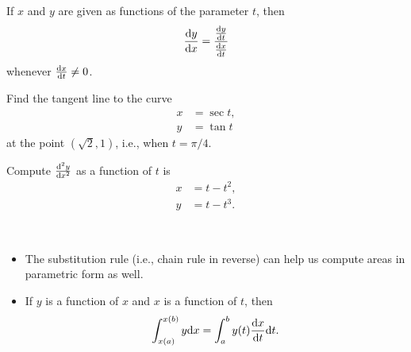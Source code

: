 

\begin{theorem}
If $x$ and $y$ are given as functions of the parameter $t$, then
\begin{equation*}
\frac{\mathrm{d} y}{\mathrm{d} x} = \frac{\frac{\mathrm{d} y}{\mathrm{d} t}}{\frac{\mathrm{d} x}{\mathrm{d} t}}
\end{equation*}
whenever $\frac{\mathrm{d} x}{\mathrm{d} t}\ne 0$.
\end{theorem}

\begin{example}
Find the tangent line to the curve
\begin{align*}
x &= \sec t,\\
y &= \tan t
\end{align*}
at the point $(\sqrt 2, 1)$, i.e., when $t=\pi/4$.
\end{example}

\newpage

\begin{example}
Compute $\frac{\mathrm{d}^2 y}{\mathrm{d} x^2}$ as a function of $t$ is
\begin{align*}
x & = t-t^2,\\
y &= t-t^3.
\end{align*}
\end{example}

\newpage

\begin{remark}\,
\begin{itemize}
\item The substitution rule (i.e., chain rule in reverse) can help us compute areas in parametric form as well.
\item If $y$ is a function of $x$ and $x$ is a function of $t$, then
\begin{equation*}
\int_{x(a)}^{x(b)}y\mathrm{d} x = \int_a^b y(t)\frac{\mathrm{d} x}{\mathrm{d} t}\mathrm{d} t.
\end{equation*}
\end{itemize}
\end{remark}

